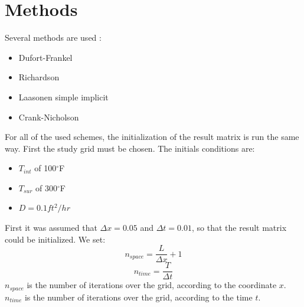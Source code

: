 \documentclass{article}
\begin{document}
    


    \newpage
    \section{Methods}

        Several methods are used :
        \begin{itemize}
            \item{Dufort-Frankel}
            \item{Richardson}
            \item{Laasonen simple implicit}
            \item{Crank-Nicholson}
        \end{itemize}
        For all of the used schemes, the initialization of the result matrix is run the same way.
        First the study grid must be chosen. The initials conditions are:
        \begin{itemize}
            \item{$T_{int}$ of 100$^{\circ}$F}
            \item{$T_{sur}$ of 300$^{\circ}$F}
            \item{$D = 0.1 ft^{2}/hr$}
        \end{itemize}
        First it was assumed that $\Delta x = 0.05$ and $\Delta t = 0.01$,
        so that the result matrix could be initialized.
        We set:
        \begin{equation}
            n_{space} = \frac{L}{\Delta x} + 1
        \end{equation}
        \begin{equation}
            n_{time} = \frac{T}{\Delta t}
        \end{equation}
        $n_{space}$ is the number of iterations over the grid, according to the coordinate $x$. \\
        $n_{time}$ is the number of iterations over the grid, according to the time $t$. \\
        
\end{document}
